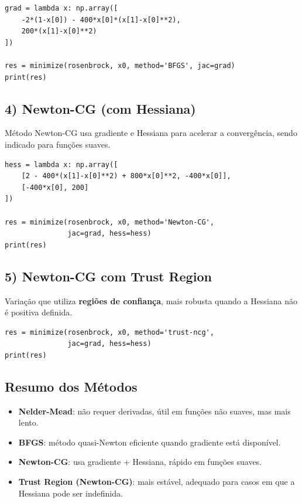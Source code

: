 \documentclass[9pt,a4paper]{extarticle}
\begin{document}
\begin{lstlisting}
grad = lambda x: np.array([
    -2*(1-x[0]) - 400*x[0]*(x[1]-x[0]**2),
    200*(x[1]-x[0]**2)
])

res = minimize(rosenbrock, x0, method='BFGS', jac=grad)
print(res)
\end{lstlisting}

\subsection*{4) Newton-CG (com Hessiana)}

Método Newton-CG usa gradiente e Hessiana para acelerar a convergência, sendo indicado para funções suaves.

\begin{lstlisting}
hess = lambda x: np.array([
    [2 - 400*(x[1]-x[0]**2) + 800*x[0]**2, -400*x[0]],
    [-400*x[0], 200]
])

res = minimize(rosenbrock, x0, method='Newton-CG',
               jac=grad, hess=hess)
print(res)
\end{lstlisting}

\subsection*{5) Newton-CG com Trust Region}

Variação que utiliza \textbf{regiões de confiança}, mais robusta quando a Hessiana não é positiva definida.

\begin{lstlisting}
res = minimize(rosenbrock, x0, method='trust-ncg',
               jac=grad, hess=hess)
print(res)
\end{lstlisting}

\subsection*{Resumo dos Métodos}
\begin{itemize}
    \item \textbf{Nelder-Mead}: não requer derivadas, útil em funções não suaves, mas mais lento.
    \item \textbf{BFGS}: método quasi-Newton eficiente quando gradiente está disponível.
    \item \textbf{Newton-CG}: usa gradiente + Hessiana, rápido em funções suaves.
    \item \textbf{Trust Region (Newton-CG)}: mais estável, adequado para casos em que a Hessiana pode ser indefinida.
\end{itemize}
\end{document}
